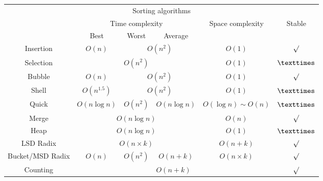 \begin{table}[H]
    \centering
    \begin{tabular}{|c|c|c|c|c|c|}
        \hline
        \multicolumn{6}{|c|}{Sorting algorithms} \\
        \Xhline{3\arrayrulewidth}
        \multirow{2}{*}{Method} & \multicolumn{3}{c|}{Time complexity} & \multirow{2}{*}{Space complexity} & \multirow{2}{*}{Stable} \\
        \cline{2-4}
        & Best & Worst & Average & & \\
        \Xhline{2\arrayrulewidth}
        Insertion & $O(n)$ & \multicolumn{2}{c|}{$O(n^2)$} & $O(1)$ & $\surd$ \\
        \hline
        Selection & \multicolumn{3}{c|}{$O(n^2)$} & $O(1)$ & $\texttimes$ \\
        \hline
        Bubble & $O(n)$ & \multicolumn{2}{c|}{$O(n^2)$} & $O(1)$ & $\surd$ \\
        \hline
        Shell & $O(n^{1.5})$ & \multicolumn{2}{c|}{$O(n^2)$} & $O(1)$ & $\texttimes$ \\
        \hline
        Quick & $O(n\log n)$ & $O(n^2)$ & $O(n\log n)$ & $O(\log n) \sim O(n)$ & $\texttimes$ \\
        \hline
        Merge & \multicolumn{3}{c|}{$O(n\log n)$} & $O(n)$ & $\surd$ \\
        \hline
        Heap & \multicolumn{3}{c|}{$O(n\log n)$} & $O(1)$ & $\texttimes$ \\
        \hline
        LSD Radix & \multicolumn{3}{c|}{$O(n \times k)$} & $O(n + k)$ & $\surd$ \\
        \hline
        Bucket/MSD Radix & $O(n)$ & $O(n^2)$ & $O(n + k)$ & $O(n \times k)$ & $\surd$ \\
        \hline
        Counting & \multicolumn{4}{c|}{$O(n + k)$} & $\surd$ \\
        \hline
    \end{tabular}
\end{table}

